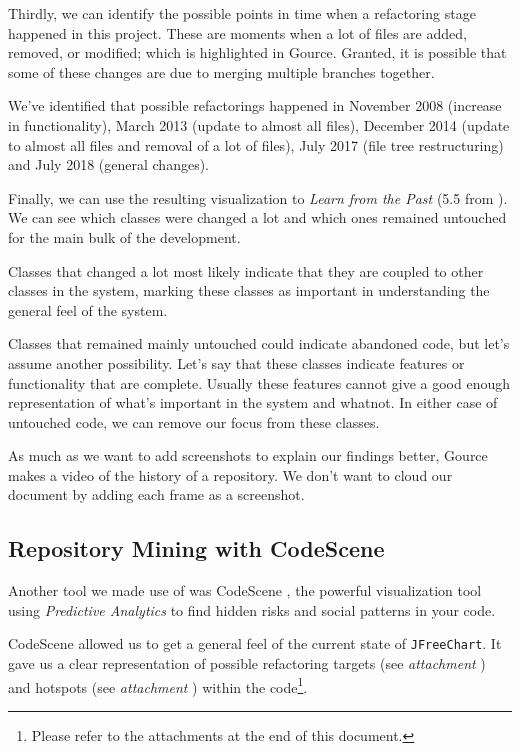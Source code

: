 \documentclass[11pt]{article}
\begin{document}
	Thirdly, we can identify the possible points in time when a refactoring stage happened in this project. These are moments when a lot of files are added, removed, or modified; which is highlighted in \textsf{Gource}. Granted, it is possible that some of these changes are due to merging multiple branches together.
	
	We've identified that possible refactorings happened in November 2008 (increase in functionality), March 2013 (update to almost all files), December 2014 (update to almost all files and removal of a lot of files), July 2017 (file tree restructuring) and July 2018 (general changes).
	
	Finally, we can use the resulting visualization to \textsl{Learn from the Past} (5.5 from \cite{demeyer2009object}). We can see which classes were changed a lot and which ones remained untouched for the main bulk of the development.
	
	Classes that changed a lot most likely indicate that they are coupled to other classes in the system, marking these classes as important in understanding the general feel of the system.
	
	Classes that remained mainly untouched could indicate abandoned code, but let's assume another possibility. Let's say that these classes indicate features or functionality that are complete. Usually these features cannot give a good enough representation of what's important in the system and whatnot. In either case of untouched code, we can remove our focus from these classes.
	
	As much as we want to add screenshots to explain our findings better, \textsf{Gource} makes a video of the history of a repository. We don't want to cloud our document by adding each frame as a screenshot.
	
	\subsection{Repository Mining with CodeScene}
	\label{sec:codescene}
	Another tool we made use of was \textsf{CodeScene} \cite{codescene}, the powerful visualization tool using \textit{Predictive Analytics} to find hidden risks and social patterns in your code.
	
	\textsf{CodeScene} allowed us to get a general feel of the current state of \texttt{JFreeChart}. It gave us a clear representation of possible refactoring targets (see \textsl{attachment \pageref{refactoring-overview}}) and hotspots (see \textsl{attachment \pageref{hotspots-overview}}) within the code\footnote{Please refer to the attachments at the end of this document.}.
	
\end{document}
